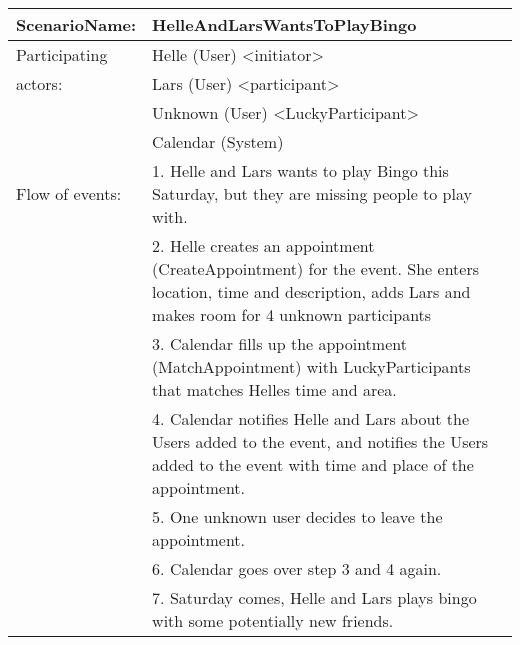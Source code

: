 {\tabulinesep=1.2mm
\begin{tabu}{ | p{3cm} | p{13cm} |}
    \hline
    ScenarioName: 			& 		HelleAndLarsWantsToPlayBingo\\ \hline
    Participating 			& 		Helle (User) <initiator> \\
    actors:					&		Lars (User) <participant>\\ 
    						&		Unknown (User) <LuckyParticipant> \\
    						&		Calendar (System) \\	\hline
    Flow of events: 		& 		1. Helle and Lars wants to play Bingo this Saturday, but they are missing people to play with. \\
							&		2. Helle creates an appointment (CreateAppointment) for the event. She enters location, time and description, adds Lars and makes room for 4 unknown participants\\
							&		3. Calendar fills up the appointment (MatchAppointment) with LuckyParticipants that matches Helles time and area.\\
							&		4. Calendar notifies Helle and Lars about the Users added to the event, and notifies the Users added to the event with time and place of the appointment.\\
							&		5. One unknown user decides to leave the appointment. \\
							&		6. Calendar goes over step 3 and 4 again.\\
							&		7. Saturday comes, Helle and Lars plays bingo with some potentially new friends.\\ \hline
\end{tabu}
}
